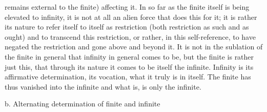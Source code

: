 remains external to the finite) affecting it. In so far as the finite itself is
being elevated to infinity, it is not at all an alien force that does this for it;
it is rather its nature to refer itself to itself as restriction (both restriction
as such and as ought) and to transcend this restriction, or rather, in this
self-reference, to have negated the restriction and gone above and beyond
it. It is not in the sublation of the finite in general that infinity in general
comes to be, but the finite is rather just this, that through its nature it
comes to be itself the infinite. Infinity is its affirmative determination, its
vocation, what it truly is in itself.
The finite has thus vanished into the infinite and what is, is only the
infinite.

b. Alternating determination of finite and infinite

